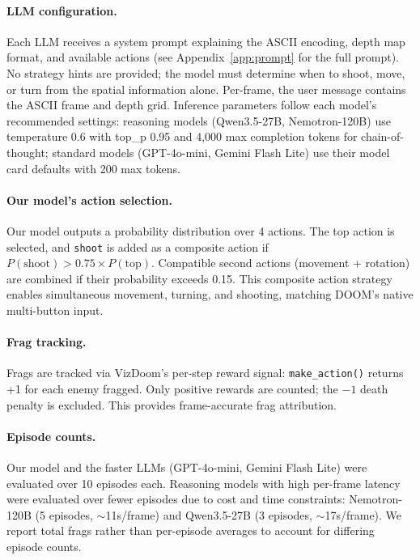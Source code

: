 \documentclass[11pt,a4paper]{article}
\begin{document}
\paragraph{LLM configuration.} Each LLM receives a system prompt explaining the ASCII encoding, depth map format, and available actions (see Appendix~\ref{app:prompt} for the full prompt). No strategy hints are provided; the model must determine when to shoot, move, or turn from the spatial information alone. Per-frame, the user message contains the ASCII frame and depth grid. Inference parameters follow each model's recommended settings: reasoning models (Qwen3.5-27B, Nemotron-120B) use temperature 0.6 with top\_p 0.95 and 4,000 max completion tokens for chain-of-thought; standard models (GPT-4o-mini, Gemini Flash Lite) use their model card defaults with 200 max tokens.

\paragraph{Our model's action selection.} Our model outputs a probability distribution over 4 actions. The top action is selected, and \texttt{shoot} is added as a composite action if $P(\text{shoot}) > 0.75 \times P(\text{top})$. Compatible second actions (movement + rotation) are combined if their probability exceeds 0.15. This composite action strategy enables simultaneous movement, turning, and shooting, matching DOOM's native multi-button input.

\paragraph{Frag tracking.} Frags are tracked via VizDoom's per-step reward signal: \texttt{make\_action()} returns +1 for each enemy fragged. Only positive rewards are counted; the $-1$ death penalty is excluded. This provides frame-accurate frag attribution.

\paragraph{Episode counts.} Our model and the faster LLMs (GPT-4o-mini, Gemini Flash Lite) were evaluated over 10 episodes each. Reasoning models with high per-frame latency were evaluated over fewer episodes due to cost and time constraints: Nemotron-120B (5 episodes, ${\sim}$11s/frame) and Qwen3.5-27B (3 episodes, ${\sim}$17s/frame). We report total frags rather than per-episode averages to account for differing episode counts.
\end{document}
